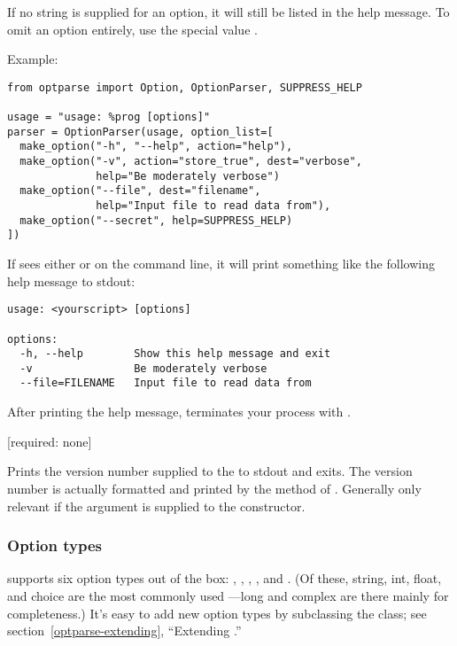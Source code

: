 \begin{definitions}
If no  string is supplied for an option, it will still be
listed in the help message.  To omit an option entirely, use the
special value .

Example:

\begin{verbatim}
from optparse import Option, OptionParser, SUPPRESS_HELP

usage = "usage: %prog [options]"
parser = OptionParser(usage, option_list=[
  make_option("-h", "--help", action="help"),
  make_option("-v", action="store_true", dest="verbose",
              help="Be moderately verbose")
  make_option("--file", dest="filename",
              help="Input file to read data from"),
  make_option("--secret", help=SUPPRESS_HELP)
])
\end{verbatim}

If  sees either  or
 on the command line, it will print something
like the following help message to stdout:

\begin{verbatim}
usage: <yourscript> [options]

options:
  -h, --help        Show this help message and exit
  -v                Be moderately verbose
  --file=FILENAME   Input file to read data from
\end{verbatim}

After printing the help message,  terminates your process
with .

 [required: none]

Prints the version number supplied to the  to
stdout and exits.  The version number is actually formatted and
printed by the  method of
.  Generally only relevant if the 
argument is supplied to the  constructor.
\end{definitions}

\subsubsection{Option types\label{optparse-option-types}}

 supports six option types out of the box: ,
, , ,  and .
(Of these, string, int, float, and choice are the most commonly used
---long and complex are there mainly for completeness.)  It's easy to
add new option types by subclassing the  class; see
section~\ref{optparse-extending}, ``Extending .''

